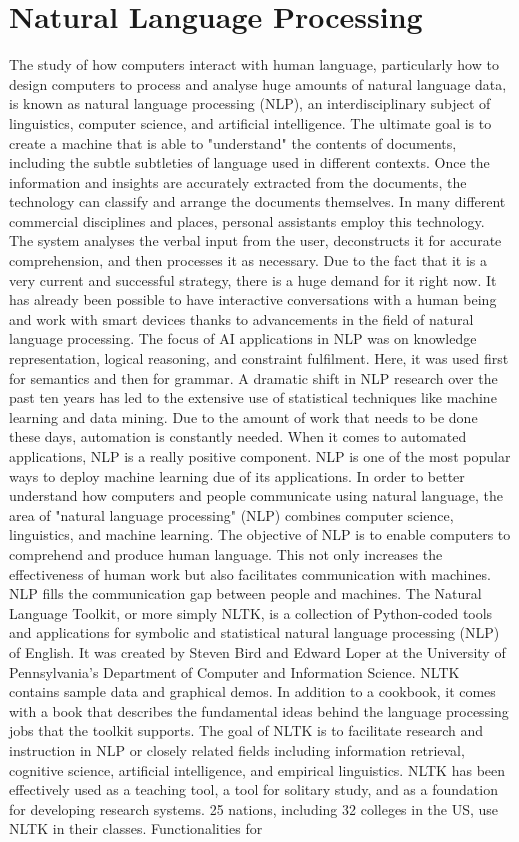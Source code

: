 \documentclass[sn-mathphys]{sn-jnl}%
\theoremstyle{thmstyleone}%
\theoremstyle{thmstyletwo}%
\theoremstyle{thmstylethree}%
\begin{document}
\section{Natural Language Processing}
The study of how computers interact with human language, particularly how to design computers to process and analyse huge amounts of natural language data, is known as natural language processing (NLP), an interdisciplinary subject of linguistics, computer science, and artificial intelligence. The ultimate goal is to create a machine that is able to "understand" the contents of documents, including the subtle subtleties of language used in different contexts. Once the information and insights are accurately extracted from the documents, the technology can classify and arrange the documents themselves. In many different commercial disciplines and places, personal assistants employ this technology. The system analyses the verbal input from the user, deconstructs it for accurate comprehension, and then processes it as necessary. Due to the fact that it is a very current and successful strategy, there is a huge demand for it right now. It has already been possible to have interactive conversations with a human being and work with smart devices thanks to advancements in the field of natural language processing. The focus of AI applications in NLP was on knowledge representation, logical reasoning, and constraint fulfilment. Here, it was used first for semantics and then for grammar. A dramatic shift in NLP research over the past ten years has led to the extensive use of statistical techniques like machine learning and data mining. Due to the amount of work that needs to be done these days, automation is constantly needed. When it comes to automated applications, NLP is a really positive component. NLP is one of the most popular ways to deploy machine learning due of its applications. In order to better understand how computers and people communicate using natural language, the area of "natural language processing" (NLP) combines computer science, linguistics, and machine learning. The objective of NLP is to enable computers to comprehend and produce human language. This not only increases the effectiveness of human work but also facilitates communication with machines. NLP fills the communication gap between people and machines. The Natural Language Toolkit, or more simply NLTK, is a collection of Python-coded tools and applications for symbolic and statistical natural language processing (NLP) of English. It was created by Steven Bird and Edward Loper at the University of Pennsylvania's Department of Computer and Information Science. NLTK contains sample data and graphical demos. In addition to a cookbook, it comes with a book that describes the fundamental ideas behind the language processing jobs that the toolkit supports. The goal of NLTK is to facilitate research and instruction in NLP or closely related fields including information retrieval, cognitive science, artificial intelligence, and empirical linguistics. NLTK has been effectively used as a teaching tool, a tool for solitary study, and as a foundation for developing research systems. 25 nations, including 32 colleges in the US, use NLTK in their classes. Functionalities for 
\end{document}
